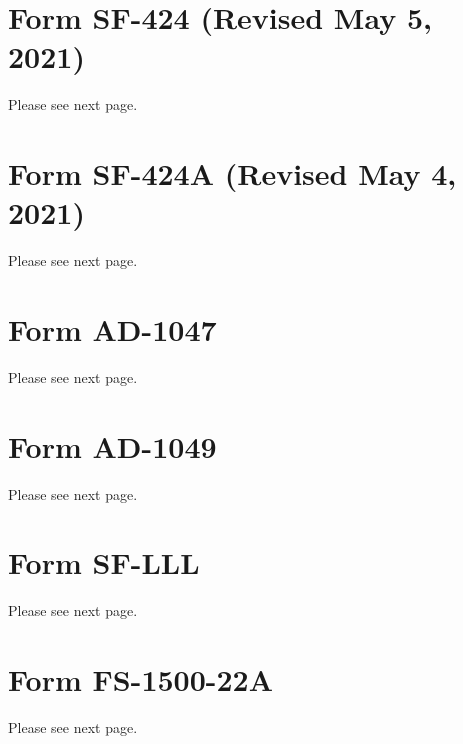 \documentclass[12pt,letterpaper,english,bibliography=totocnumbered, abstract=on]{scrartcl}
\begin{document}
%

\newpage{}
\begin{appendices}
	
\section{Form SF-424 (Revised May 5, 2021)}
Please see next page.
%

\section{Form SF-424A (Revised May 4, 2021)}
Please see next page.
%

\section{Form AD-1047}
Please see next page.
%

\section{Form AD-1049}
Please see next page.
%

\section{Form SF-LLL}
Please see next page.
%

\section{Form FS-1500-22A}
Please see next page.
%

\end{appendices}
\end{document}
